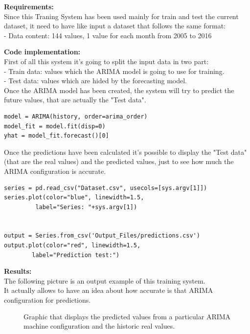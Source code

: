 \textbf{Requirements:}\\
Since this Traning System has been used mainly for train and test the current dataset, it need to have like input a dataset that follows the same format:\\
- Data content: 144 values, 1 value for each month from 2005 to 2016

\textbf{Code implementation:}\\
First of all this system it's going to split the input data in two part:\\
- Train data: values which the ARIMA model is going to use for training. \\
- Test data: values which are hided by the forecasting model. \\
Once the ARIMA model has been created, the system will try to predict the future values, that are actually the "Test data".\\

\begin{lstlisting}
model = ARIMA(history, order=arima_order)
model_fit = model.fit(disp=0)
yhat = model_fit.forecast()[0]
\end{lstlisting}

Once the predictions have been calculated it's possible to display the "Test data" (that are the real values) and the predicted values, just to see how much the ARIMA configuration is accurate.

\begin{lstlisting}
series = pd.read_csv("Dataset.csv", usecols=[sys.argv[1]])
series.plot(color="blue", linewidth=1.5,
		 label="Series: "+sys.argv[1])


output = Series.from_csv('Output_Files/predictions.csv')
output.plot(color="red", linewidth=1.5,
		label="Prediction test:")
\end{lstlisting}

\newpage

\textbf{Results:}\\
The following picture is an output example of this training system. \\
It actually allows to have an idea about how accurate is that ARIMA configuration for predictions.
\begin{figure}[H]
	\centering
    \caption{Graphic that displays the predicted values from a particular ARIMA machine configuration and the historic real values.}
\end{figure}



